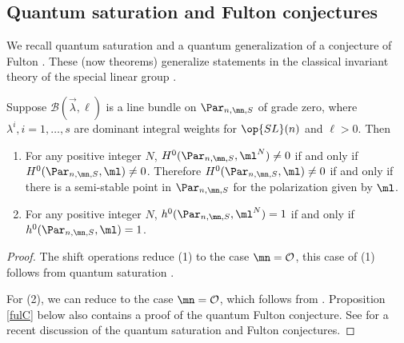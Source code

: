 \subsection{Quantum saturation and Fulton conjectures}
We recall quantum saturation \cite{BHorn} and a quantum generalization of a conjecture of Fulton \cite[Remark 8.5]{BKq}. These (now theorems) generalize statements in the classical invariant theory of the special linear group \cite{KT,KTW}.

\begin{proposition}
\notready\label{qTheorems}
Suppose $\mathcal{B}(\vec{\lambda},\ell)$ is a line bundle on  $\Par_{n,\mn,S}$ of grade zero, where $\lambda^i, i=1,\dots, s$ are dominant integral weights for $\op{SL}(n)$ and $\ell>0 $. Then
\begin{enumerate}
\item For any positive integer $N$, $H^0(\Par_{n,\mn,S},\ml^N)\neq 0$ if and only if
$H^0(\Par_{n,\mn,S},\ml)\neq 0$. Therefore $H^0(\Par_{n,\mn,S},\ml)\neq 0$ if and only if
there is a semi-stable point in $\Par_{n,\mn,S}$ for the polarization given by $\ml$.
\item For any positive integer $N$, $h^0(\Par_{n,\mn,S},\ml^N)=1$ if and only if
$h^0(\Par_{n,\mn,S},\ml)=1$.
\end{enumerate}
\end{proposition}
\begin{proof}
The shift operations reduce (1) to the case $\mn=\mathcal{O}$, this case of (1) follows from
quantum saturation \cite[Theorem 1.8]{BHorn}.

For (2), we can reduce to the case $\mn=\mathcal{O}$, which follows from  \cite[Remark 8.5]{BKq}. Proposition \ref{fulC} below also contains a proof of the quantum Fulton conjecture. See \cite{CS} for a recent discussion of the quantum saturation and Fulton conjectures.
\end{proof}


